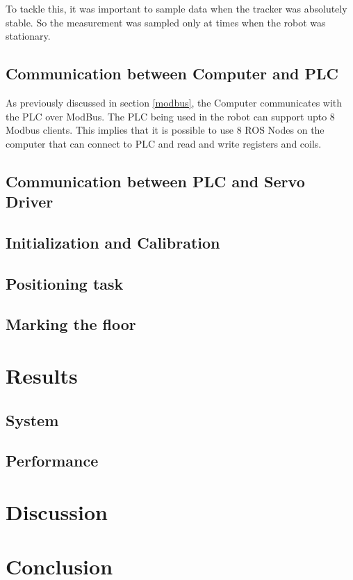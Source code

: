\documentclass{LTHthesis}
\begin{document}
            To tackle this, it was important to sample data when the tracker was absolutely stable. So the measurement was sampled only at times when the robot was stationary.
    \section{Communication between Computer and PLC}
        As previously discussed in section \ref{modbus}, the Computer communicates with the PLC over ModBus. The PLC being used in the robot can support upto 8 Modbus clients. This implies that it is possible to use 8 ROS Nodes on the computer that can connect to PLC and read and write registers and coils.
    \section{Communication between PLC and Servo Driver}
    \section{Initialization and Calibration}
    \section{Positioning task}
    \section{Marking the floor}
\chapter{Results}
    \section{System}
    \section{Performance}
\chapter{Discussion}
\chapter{Conclusion}

\printbibliography  
%  
%  
\end{document}
